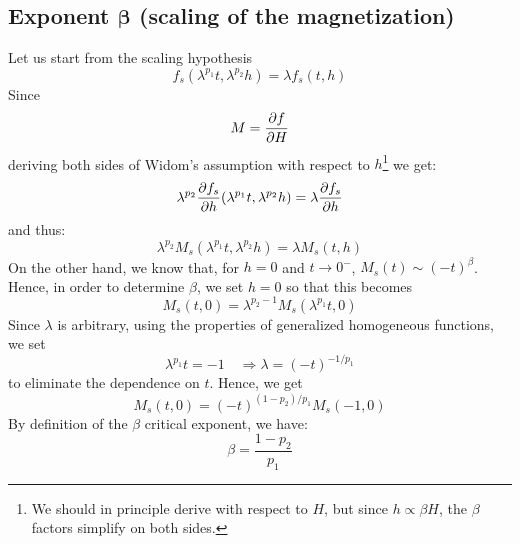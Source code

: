 \documentclass[../../Main/Main.tex]{subfiles}
\begin{document}
\subsection{Exponent \( \pmb{\beta } \) (scaling of the magnetization)}
Let us start from the scaling hypothesis
\begin{equation*}
  f_s (\lambda ^{p_1}t, \lambda ^{p_2}h) = \lambda f_s (t,h)
\end{equation*}
Since
\begin{equation*}
  M = \pdv{f}{H}
\end{equation*}
deriving both sides of Widom's assumption with respect to \( h \)\footnote{We should in principle derive with respect to \( H \), but since \( h \propto \beta H \), the  \( \beta  \) factors simplify on both sides.} we get:
\begin{equation*}
  \lambda ^{p_2} \pdv{f_s}{h} \qty(\lambda ^{p_1}t, \lambda ^{p_2}h) = \lambda \pdv{f_s}{h} (t,h)
\end{equation*}
and thus:
\begin{equation*}
   \lambda ^{p_2} M_s ( \lambda ^{p_1} t, \lambda ^{p_2} h) = \lambda M_s (t,h)
\end{equation*}
On the other hand, we know that, for \( h=0 \) and \( t \rightarrow 0^- \), \( M_s (t) \sim (-t)^{\beta } \). Hence, in order to determine \( \beta  \), we set \( h=0 \) so that this becomes
\begin{equation*}
  M_s (t,0) = \lambda ^{p_2 -1} M_s ( \lambda ^{p_1} t,0)
\end{equation*}
Since \( \lambda  \) is arbitrary, using the properties of generalized homogeneous functions, we set
\begin{equation*}
  \lambda ^{p_1} t = -1 \quad \Rightarrow \lambda = (-t)^{-1/p_1}
\end{equation*}
to eliminate the dependence on \( t \). Hence, we get
\begin{equation*}
  M_s (t,0) =  (-t)^{(1-p_2)/p_1} M_s (-1,0)
\end{equation*}
By definition of the \( \beta  \) critical exponent, we have:
\begin{equation}
  \beta = \frac{1-p_2}{p_1}
  \label{eq:19_10}
\end{equation}
\end{document}
